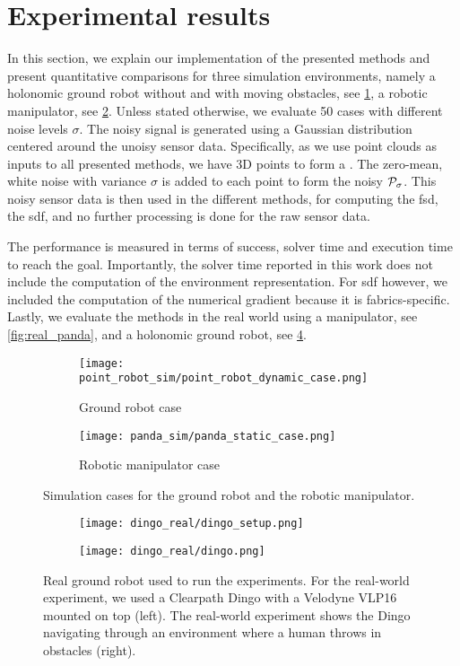 \section{Experimental results}
\label{sec:results}

In this section, we explain our implementation of the
presented methods and present quantitative
comparisons for three simulation environments, namely a
holonomic ground robot without and with moving obstacles,
see \cref{fig:point_robot_case}, a robotic manipulator, see
\cref{fig:panda_case}.
Unless stated otherwise, we evaluate 50 cases with different
noise levels $\sigma$. The noisy signal is generated using a
Gaussian distribution centered around the unoisy sensor
data. Specifically, as we use point clouds as inputs to all
presented methods, we have \np{} 3D points to form a
\pointcloud{}. The zero-mean, white noise with variance
$\sigma$ is added to each point to form the noisy
$\mathcal{P}_{\sigma}$. This noisy sensor data is then used
in the different methods, for computing the \ac{fsd}, the
\ac{sdf}, and no further processing is done for the raw
sensor data.

The performance is measured 
in terms of success, solver time and execution time to reach the goal.
Importantly, the solver time reported in this work does not
include the computation of the environment representation.
For \ac{sdf} however, we included the computation of the
numerical gradient because it is \ac{fabrics}-specific.
Lastly, 
we evaluate the methods in the real world using a
manipulator, see \cref{fig:real_panda},
and a holonomic ground robot, see \cref{fig:real_dingo}.
%
\begin{figure}[ht]
  \begin{subfigure}{0.5\linewidth}
    \texttt{[image: point\_robot\_sim/point\_robot\_dynamic\_case.png]}
    \caption{Ground robot case}
    \label{fig:point_robot_case}
  \end{subfigure}%
  \begin{subfigure}{0.5\linewidth}
    \texttt{[image: panda\_sim/panda\_static\_case.png]}
    \caption{Robotic manipulator case}
    \label{fig:panda_case}
  \end{subfigure}%
  \caption{Simulation cases for the ground robot and the robotic manipulator.}
  \label{fig:simulation_cases}
\end{figure}
%
\begin{figure}[ht]
  \begin{subfigure}{0.5\linewidth}
    \texttt{[image: dingo\_real/dingo\_setup.png]}
  \end{subfigure}%
  \begin{subfigure}{0.5\linewidth}
    \texttt{[image: dingo\_real/dingo.png]}
  \end{subfigure}%
  \caption{Real ground robot used to run the experiments.
  For the real-world experiment, we used a Clearpath Dingo
  with a Velodyne VLP16 mounted on top (left). The
  real-world experiment shows the Dingo navigating through
  an environment where a human throws in obstacles (right).
  }
  \label{fig:real_dingo}
\end{figure}
%
